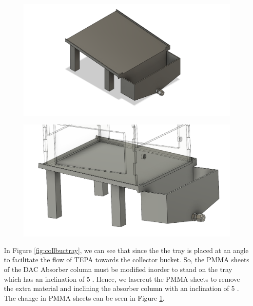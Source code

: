     \begin{figure}[H]
        \centering
        \begin{minipage}{.5\textwidth}
        \centering
        \includegraphics[width=\linewidth]{images/mywork/Sprint5/collbuc.png}
         \label{fig:collbuctray} 
    \end{minipage}%
    \begin{minipage}{.5\textwidth}
        \centering
        \includegraphics[width=\linewidth]{images/mywork/Sprint5/newpmma.png}
        \label{fig:pmmatilt}
    \end{minipage}
    \end{figure}



In Figure \ref{fig:collbuctray}, we can see that since the the tray is placed at an angle to facilitate the flow of TEPA towards the collector bucket. So, the PMMA sheets of the DAC Absorber column must be modified inorder to stand on the tray which has an inclination of 5 \degree. Hence, we lasercut the PMMA sheets to remove the extra material and inclining the absorber column with an inclination of 5 \degree. The change in PMMA sheets can be seen in Figure \ref{fig:pmmatilt}.

